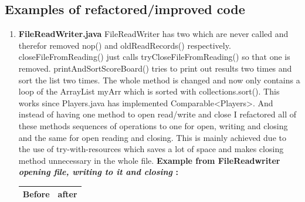 \documentclass{article}
\begin{document}
\subsection{Examples of refactored/improved code}
\begin{enumerate}
	\item
	\textbf{FileReadWriter.java}
	FileReadWriter has two which are never called and therefor removed nop() and oldReadRecords()
	respectively.
	closeFileFromReading() just calls tryCloseFileFromReading() so that one is removed.
	printAndSortScoreBoard() tries to print out results two times and sort the list two times.
	The whole method is changed and now only contains a loop of the ArrayList myArr which is sorted
	with collections.sort(). This works since Players.java has implemented Comparable<Players>.
	And instead of having one method to open read/write and close I refactored all of these methods
	sequences of operations to one for open, writing and closing and the same for open reading and closing. This is mainly achieved due to the use of try-with-resources which saves a lot of space and
	makes closing method unnecessary in the whole file. 
	\textbf{Example from FileReadwriter \textit{opening file, writing to it and closing} :\newline}
	\hspace*{-2.0cm}\begin{tabulary}{0.5\textwidth}{| c | c |}
	 \hline
	 Before & after \\ \hline

\end{tabulary}
\end{enumerate}
\end{document}
